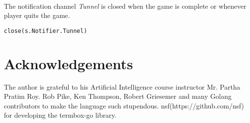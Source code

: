 \documentclass[a4paper]{article}
\begin{document}
\textrm{\normalsize{\\The notification channel \textit{Tunnel} is closed when the game is complete or whenever player quits the game.\\}}

\begin{verbatim}
close(s.Notifier.Tunnel)
\end{verbatim}

\section{Acknowledgements}

\textrm{\normalsize{The author is grateful to his Artificial Intelligence course instructor Mr. Partha Pratim Roy. Rob Pike,
Ken Thompson, Robert Griesemer and many Golang contributors to make the language such
stupendous. nsf(https://github.com/nsf) for developing the termbox-go library.\\}}
\end{document}
